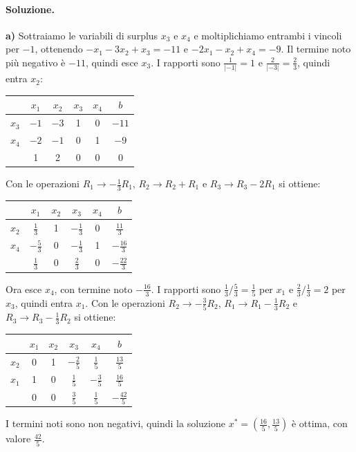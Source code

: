 \paragraph{Soluzione.}
\textbf{a)} Sottraiamo le variabili di surplus $x_3$ e $x_4$ e moltiplichiamo entrambi i vincoli per $-1$, ottenendo $-x_1 - 3x_2 + x_3 = -11$ e $-2x_1 - x_2 + x_4 = -9$. Il termine noto più negativo è $-11$, quindi esce $x_3$. I rapporti sono $\frac{1}{|-1|} = 1$ e $\frac{2}{|-3|} = \frac23$, quindi entra $x_2$:
\begin{center}
\begin{tabular}{c|cccc|c}
 & $x_1$ & $x_2$ & $x_3$ & $x_4$ & $b$ \\
\hline
$x_3$ & $-1$ & $\boxed{-3}$ & 1 & 0 & $-11$ \\
$x_4$ & $-2$ & $-1$ & 0 & 1 & $-9$ \\
\hline
 & 1 & 2 & 0 & 0 & 0 \\
\end{tabular}
\end{center}
Con le operazioni $R_1 \to -\frac13 R_1$, $R_2 \to R_2 + R_1$ e $R_3 \to R_3 - 2R_1$ si ottiene:
\begin{center}
\begin{tabular}{c|cccc|c}
 & $x_1$ & $x_2$ & $x_3$ & $x_4$ & $b$ \\
\hline
$x_2$ & $\frac13$ & 1 & $-\frac13$ & 0 & $\frac{11}{3}$ \\
$x_4$ & $\boxed{-\tfrac53}$ & 0 & $-\frac13$ & 1 & $-\frac{16}{3}$ \\
\hline
 & $\frac13$ & 0 & $\frac23$ & 0 & $-\frac{22}{3}$ \\
\end{tabular}
\end{center}
Ora esce $x_4$, con termine noto $-\frac{16}{3}$. I rapporti sono $\frac13 / \frac53 = \frac15$ per $x_1$ e $\frac23 / \frac13 = 2$ per $x_3$, quindi entra $x_1$. Con le operazioni $R_2 \to -\frac35 R_2$, $R_1 \to R_1 - \frac13 R_2$ e $R_3 \to R_3 - \frac13 R_2$ si ottiene:
\begin{center}
\begin{tabular}{c|cccc|c}
 & $x_1$ & $x_2$ & $x_3$ & $x_4$ & $b$ \\
\hline
$x_2$ & 0 & 1 & $-\frac25$ & $\frac15$ & $\frac{13}{5}$ \\
$x_1$ & 1 & 0 & $\frac15$ & $-\frac35$ & $\frac{16}{5}$ \\
\hline
 & 0 & 0 & $\frac35$ & $\frac15$ & $-\frac{42}{5}$ \\
\end{tabular}
\end{center}
I termini noti sono non negativi, quindi la soluzione $x^* = (\frac{16}{5}, \frac{13}{5})$ è ottima, con valore $\frac{42}{5}$.

